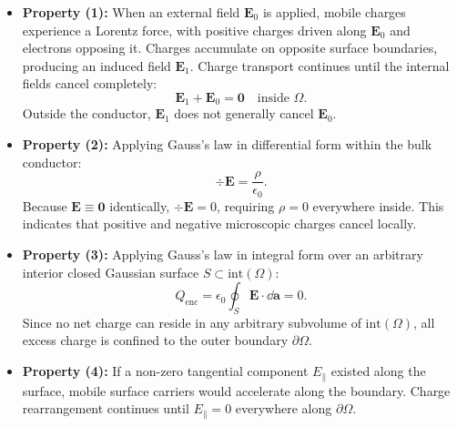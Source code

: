 \begin{proofbox}
    \begin{itemize}
        \item \textbf{Property (1):} When an external field \(\bm{E}_0\) is applied, mobile charges experience a Lorentz force, with positive charges driven along \(\bm{E}_0\) and electrons opposing it. Charges accumulate on opposite surface boundaries, producing an induced field \(\bm{E}_1\). Charge transport continues until the internal fields cancel completely:
        \begin{equation}
            \bm{E}_1 + \bm{E}_0 = \bm{0} \quad \text{inside } \Omega.
        \end{equation}
        Outside the conductor, \(\bm{E}_1\) does not generally cancel \(\bm{E}_0\).
        
        \item \textbf{Property (2):} Applying Gauss's law in differential form within the bulk conductor:
        \begin{equation}
            \div{\bm{E}} = \frac{\rho}{\epsilon_0}.
        \end{equation}
        Because \(\bm{E} \equiv \bm{0}\) identically, \(\div{\bm{E}} = 0\), requiring \(\rho = 0\) everywhere inside. This indicates that positive and negative microscopic charges cancel locally.
        
        \item \textbf{Property (3):} Applying Gauss's law in integral form over an arbitrary interior closed Gaussian surface \(S \subset \mathrm{int}(\Omega)\):
        \begin{equation}
            Q_{\text{enc}} = \epsilon_0 \oint_S \bm{E}\cdot\dd\bm{a} = 0.
        \end{equation}
        Since no net charge can reside in any arbitrary subvolume of \(\mathrm{int}(\Omega)\), all excess charge is confined to the outer boundary \(\partial\Omega\).
        
        \item \textbf{Property (4):} If a non-zero tangential component \(E_\parallel\) existed along the surface, mobile surface carriers would accelerate along the boundary. Charge rearrangement continues until \(E_\parallel = 0\) everywhere along \(\partial\Omega\).
        

\end{itemize}
\end{proofbox}

